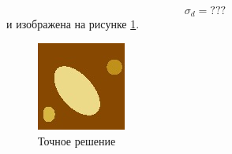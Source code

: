 \documentclass{procDDs}
\begin{document}
\begin{equation}
	\sigma_d=???
\end{equation}
 и изображена на рисунке \ref{ris:dno}.

\begin{figure}[h!]\center
	
		\includegraphics[width=0.3\linewidth]{img/dno.jpg}
	\caption{Точное решение}
	\label{ris:dno}
\end{figure}
\end{document}
